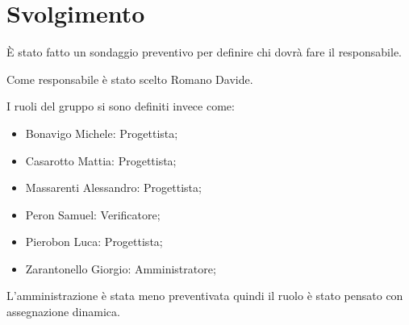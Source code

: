 \section{Svolgimento}

È stato fatto un sondaggio preventivo per definire chi dovrà fare il responsabile.

Come responsabile è stato scelto Romano Davide.

I ruoli del gruppo si sono definiti invece come:
\begin{itemize}
    \item Bonavigo Michele: Progettista;
    \item Casarotto Mattia: Progettista;
    \item Massarenti Alessandro: Progettista;
    \item Peron Samuel: Verificatore;
    \item Pierobon Luca: Progettista;
    \item Zarantonello Giorgio: Amministratore;
\end{itemize}

L'amministrazione è stata meno preventivata quindi il ruolo è stato pensato con assegnazione dinamica.